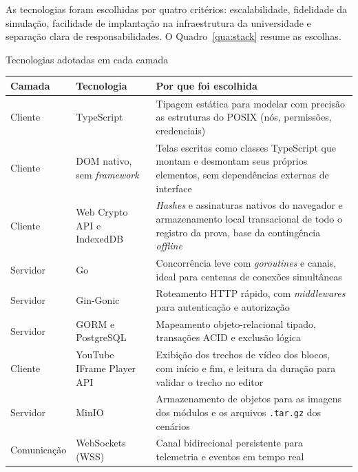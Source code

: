 As tecnologias foram escolhidas por quatro critérios: escalabilidade, fidelidade da simulação, facilidade de implantação na infraestrutura da universidade e separação clara de responsabilidades. O Quadro~\ref{qua:stack} resume as escolhas.

\begin{quadro}[htbp]
    \caption{Tecnologias adotadas em cada camada}
    \label{qua:stack}
    \footnotesize
    \begin{tabularx}{\textwidth}{|p{2.2cm}|p{3.4cm}|L|}
        \hline
        \textbf{Camada} & \textbf{Tecnologia} & \textbf{Por que foi escolhida} \\
        \hline
        Cliente & TypeScript & Tipagem estática para modelar com precisão as estruturas do POSIX (nós, permissões, credenciais) \\
        \hline
        Cliente & DOM nativo, sem \textit{framework} & Telas escritas como classes TypeScript que montam e desmontam seus próprios elementos, sem dependências externas de interface \\
        \hline
        Cliente & Web Crypto API e IndexedDB & \textit{Hashes} e assinaturas nativos do navegador e armazenamento local transacional de todo o registro da prova, base da contingência \textit{offline} \\
        \hline
        Servidor & Go & Concorrência leve com \textit{goroutines} e canais, ideal para centenas de conexões simultâneas \\
        \hline
        Servidor & Gin-Gonic & Roteamento HTTP rápido, com \textit{middlewares} para autenticação e autorização \\
        \hline
        Servidor & GORM e PostgreSQL & Mapeamento objeto-relacional tipado, transações ACID e exclusão lógica \\
        \hline
        Cliente & YouTube IFrame Player API & Exibição dos trechos de vídeo dos blocos, com início e fim, e leitura da duração para validar o trecho no editor \\
        \hline
        Servidor & MinIO & Armazenamento de objetos para as imagens dos módulos e os arquivos \texttt{.tar.gz} dos cenários \\
        \hline
        Comunicação & WebSockets (WSS) & Canal bidirecional persistente para telemetria e eventos em tempo real \\
        \hline
    \end{tabularx}
\end{quadro}

